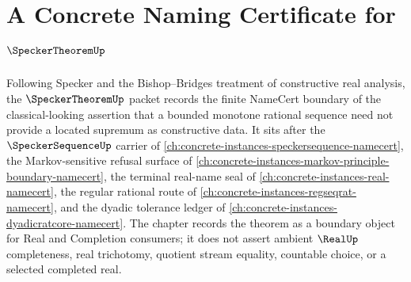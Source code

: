 \chapter{A Concrete Naming Certificate for $\SpeckerTheoremUp$}
\label{ch:concrete-instances-specker-theorem-namecert}

Following Specker and the Bishop--Bridges treatment of constructive real analysis, the $\SpeckerTheoremUp$ packet records the finite NameCert boundary of the classical-looking assertion that a bounded monotone rational sequence need not provide a located supremum as constructive data. It sits after the $\SpeckerSequenceUp$ carrier of \autoref{ch:concrete-instances-speckersequence-namecert}, the Markov-sensitive refusal surface of \autoref{ch:concrete-instances-markov-principle-boundary-namecert}, the terminal real-name seal of \autoref{ch:concrete-instances-real-namecert}, the regular rational route of \autoref{ch:concrete-instances-regseqrat-namecert}, and the dyadic tolerance ledger of \autoref{ch:concrete-instances-dyadicratcore-namecert}. The chapter records the theorem as a boundary object for Real and Completion consumers; it does not assert ambient $\RealUp$ completeness, real trichotomy, quotient stream equality, countable choice, or a selected completed real.

